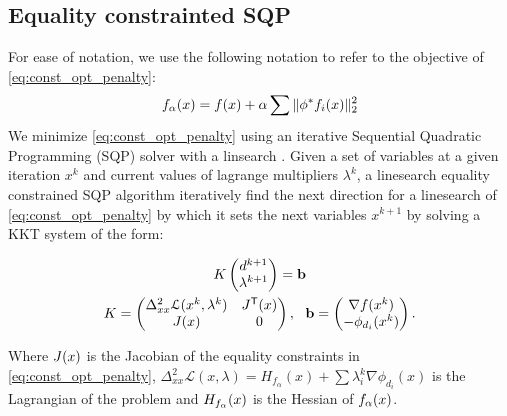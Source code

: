 \subsection{Equality constrainted SQP}
For ease of notation, we use the following notation to refer to the objective of \eqref{eq:const_opt_penalty}:
\begin{equation}
f_\alpha(x) = f(x) + \alpha \sum \|\phi^*{f_i}(x)\|_2^2
\end{equation}
We minimize \eqref{eq:const_opt_penalty} using an iterative Sequential Quadratic Programming (SQP) solver with a linsearch \cite{nocedal}. Given a set of variables at a given iteration $x^k$ and current values of lagrange multipliers $\lambda^k$, a linesearch equality constrained SQP algorithm iteratively find the next direction for a linesearch of \eqref{eq:const_opt_penalty} by which it sets the next variables $x^{k+1}$ by solving a KKT system of the form:

\begin{equation} \label{eq:KKT_eps}
\begin{gathered}
{K} \begin{pmatrix} d^{k+1} \\ \lambda^{k+1} \end{pmatrix}=\mathbf{b} \\
{K}=\begin{pmatrix}
{\Delta^2_{xx}\mathcal{L}(x^k,\lambda^k)} & {J^\tr}(x)\\
{J(x)} &  0 \\
\end{pmatrix}, \ \ 
\mathbf{b}=\begin{pmatrix}
{\nabla f(x^k)} \\ 
-\phi_{d_i}(x^k)\\
\end{pmatrix}.
\end{gathered}
\end{equation}

Where $J(x)$ is the Jacobian of the equality constraints in \eqref{eq:const_opt_penalty}, $\Delta^2_{xx}\mathcal{L}(x,\lambda) = H_{f_\alpha}(x)+\sum\lambda_i^{k} \nabla \phi_{d_i}(x)$ is the Lagrangian of the problem and $H_{f_\alpha}(x)$ is the Hessian of $f_\alpha(x)$.

 
